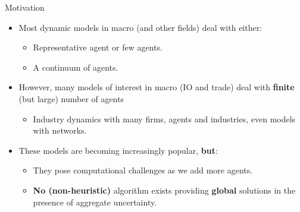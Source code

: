 \documentclass[aspectratio=169,10pt]{beamer}
\newcommand{\emphcolor}[1]{\textbf{\textcolor{emphcolorval}{#1}}}
\begin{document}
\begin{frame}{Motivation}
	\begin{itemize}
		\item Most dynamic models in macro (and other fields) deal with either:\vspace{0.1in}
		\begin{itemize}
		\item Representative agent or few agents.\vspace{0.1in}
		\item A continuum of agents.\vspace{0.1in}
		\end{itemize} 
	\item However, many models of interest in macro (IO and trade) deal with \emphcolor{finite} (but large) number of agents
		\begin{itemize}
		\item Industry dynamics with many firms, agents and industries,  even models with networks.\vspace{0.1in}
		
	\end{itemize}
	\item These models are becoming increasingly popular, \emphcolor{but}:\vspace{0.1in}
		\begin{itemize}
			\item They pose computational challenges as we add more agents.\vspace{0.1in}
			\item \emphcolor{No (non-heuristic)} algorithm exists providing \emphcolor{global} solutions in the presence of aggregate uncertainty.  
		\end{itemize}	
	\end{itemize}	
	
\end{frame}

\end{document}
